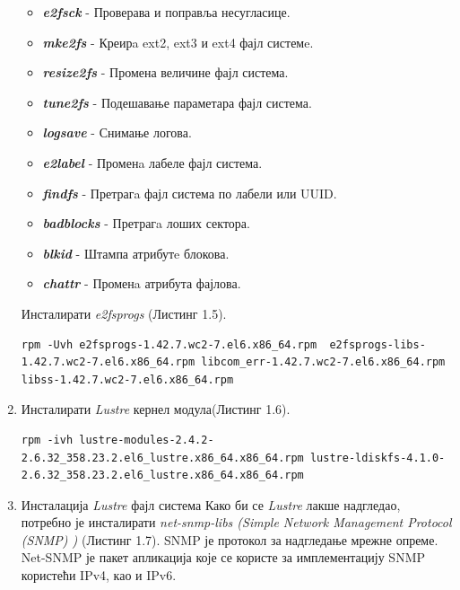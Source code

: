 \begin{enumerate}
\begin{itemize}
\item \textbf{\textit{e2fsck}} - Проверава и поправља несугласице.
\item \textbf{\textit{mke2fs}} - Креирa ext2, ext3 и ext4 фајл системe.
\item \textbf{\textit{resize2fs}} - Промена величине фајл система.
\item \textbf{\textit{tune2fs}} - Подешавање параметара фајл система.
\item \textbf{\textit{logsave}} - Снимање логова.
\item \textbf{\textit{e2label}} - Променa лабеле фајл система.
\item \textbf{\textit{findfs}} - Претрагa фајл система по лабели или UUID.
\item \textbf{\textit{badblocks}} - Претрагa лоших сектора.
\item \textbf{\textit{blkid}} - Штампа атрибутe блокова.
\item \textbf{\textit{chattr}}  - Променa атрибута фајлова.
\end{itemize}

Инсталирати \textit{e2fsprogs} (Листинг 1.5).

\begin{lstlisting}[style=nonumbers,frame=single,caption=Инсталација \textit{e2fsprogs}]
rpm -Uvh e2fsprogs-1.42.7.wc2-7.el6.x86_64.rpm  e2fsprogs-libs-1.42.7.wc2-7.el6.x86_64.rpm libcom_err-1.42.7.wc2-7.el6.x86_64.rpm libss-1.42.7.wc2-7.el6.x86_64.rpm 
\end{lstlisting}

\item  Инсталирати   \textit{Lustre} кернел модула(Листинг 1.6).

\begin{lstlisting}[style=nonumbers,frame=single,caption=Инсталација кернел модула]
rpm -ivh lustre-modules-2.4.2-2.6.32_358.23.2.el6_lustre.x86_64.x86_64.rpm lustre-ldiskfs-4.1.0-2.6.32_358.23.2.el6_lustre.x86_64.x86_64.rpm
\end{lstlisting}

\item Инсталација   \textit{Lustre} фајл система 
Како би се   \textit{Lustre} лакше надгледао, потребно је инсталирати \textit{net-snmp-libs (Simple Network Management Protocol (\gls{SNMP}) )} (Листинг 1.7). SNMP је протокол за надгледање мрежне опреме. Net-SNMP је пакет апликација које се користе за имплементацију SNMP користећи IPv4, као и IPv6.


\end{enumerate}
